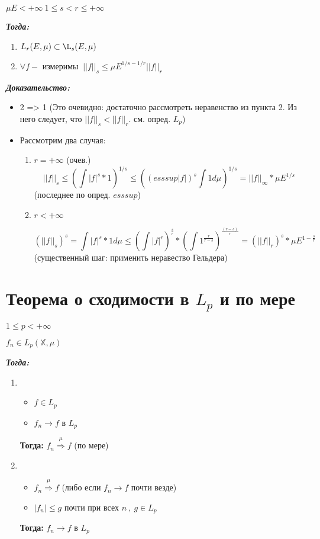\documentclass[paper=a4, fontsize=13.2pt]{article}
\begin{document}
$ \mu E < +\infty ~ 1 \leq s < r \leq + \infty$

\textbf{\emph{Тогда:}} 

\begin{enumerate}
	\item $ L_r(E, \mu)  \subset \L_s(E, \mu)$
	\item $ \forall f - $ измеримы $ ~ ||f||_s \leq \mu E^{1/s - 1/r} ||f||_r$
\end{enumerate}
 
\textbf{\emph{Доказательство:}}

\begin{itemize}
	\item 2 => 1 (Это очевидно: достаточно рассмотреть неравенство из пункта 2. Из него следует, что $ ||f||_s < ||f||_r $. см. опред. $ L_p $)
	
	\item Рассмотрим два случая: 
	\begin{enumerate}
		\item $ r = + \infty $ (очев.)
		$$ ||f||_s \leq (\int |f|^s * 1)^{1/s} \leq ((esssup|f|)^s \int 1 d\mu)^{1/s} = ||f||_{\infty} * \mu E^{1/s} $$ (последнее по опред. $ esssup $) 
		
		\item $ r < + \infty $
		
		$$ (||f||_s)^{s} = \int |f|^s * 1 d\mu  \leq 
		(\int |f|^r)^\frac{s}{r} * (\int 1^\frac{r}{r - s})^\frac{(r - s )}{r} = 
		(||f||_r)^s * \mu E^{1 - \frac{s}{r}} $$ (существенный шаг: применить неравество Гельдера)
	\end{enumerate}
\end{itemize} 
  
\section{Теорема о сходимости в $L_p$ и по мере}
$ 1 \leq p < +\infty $

$ f_n \in L_p(\mathbb{X}, \mu)$

\textbf{\emph{Тогда:}}

\begin{enumerate}
	
	
	\item \begin{itemize}
		\item $ f \in L_p $
		\item $ f_n \rightarrow f $ в $ L_p $
	\end{itemize} 
	\textbf{Тогда:} $ f_n \stackrel{\mu}{\Rightarrow} f $ (по мере)
		
	\item \begin{itemize}
		\item $ f_n \stackrel{\mu}{\Rightarrow} f $ (либо если $ f_n \rightarrow f $  почти везде)
		\item $ |f_n| \leq g $ почти при всех $ n ~ , ~ g \in L_p $
	\end{itemize} 
	\textbf{Тогда:} $ f_n \rightarrow f $ в $ L_p $
\end{enumerate}
\end{document}
